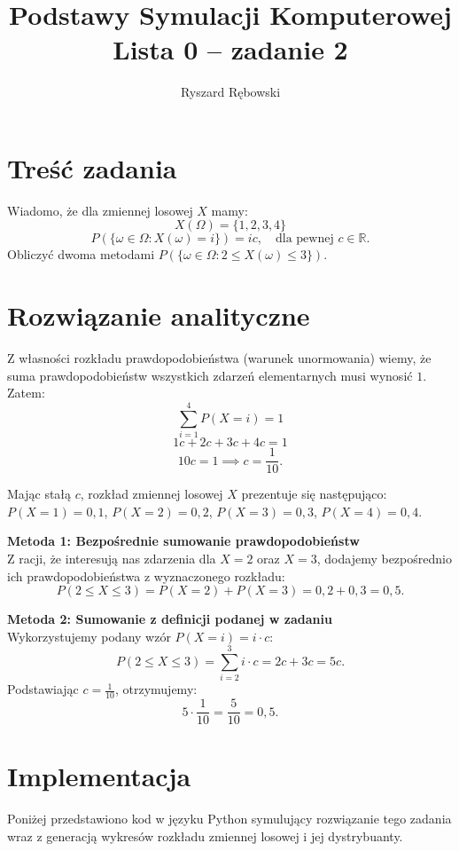 \documentclass[12pt,a4paper]{article}
\title{Podstawy Symulacji Komputerowej\\Lista 0 -- zadanie 2}
\author{Ryszard Rębowski}
\date{}
\newcommand{\sekcjazwstep}[2]{%
  \Needspace{10\baselineskip}%
  \section*{#1}%
  \nopagebreak[4]%
  #2%
}
\begin{document}
\maketitle

\sekcjazwstep{Treść zadania}{%
Wiadomo, że dla zmiennej losowej $X$ mamy:
\[ X(\Omega)=\{1,2,3,4\} \]
\[ P(\{\omega\in\Omega:X(\omega)=i\})=ic, \quad \text{dla pewnej } c\in \mathbb{R}. \]
Obliczyć dwoma metodami $P(\{\omega\in\Omega:2\le X(\omega)\le3\})$.
}

\sekcjazwstep{Rozwiązanie analityczne}{%
Z własności rozkładu prawdopodobieństwa (warunek unormowania) wiemy, że suma prawdopodobieństw wszystkich zdarzeń elementarnych musi wynosić $1$. Zatem:
\[ \sum_{i=1}^{4} P(X=i) = 1 \]
\[ 1c + 2c + 3c + 4c = 1 \]
\[ 10c = 1 \implies c = \frac{1}{10}. \]

Mając stałą $c$, rozkład zmiennej losowej $X$ prezentuje się następująco:
$P(X=1)=0{,}1$, $P(X=2)=0{,}2$, $P(X=3)=0{,}3$, $P(X=4)=0{,}4$.

\textbf{Metoda 1: Bezpośrednie sumowanie prawdopodobieństw} \\
Z racji, że interesują nas zdarzenia dla $X=2$ oraz $X=3$, dodajemy bezpośrednio ich prawdopodobieństwa z wyznaczonego rozkładu:
\[ P(2 \le X \le 3) = P(X=2) + P(X=3) = 0{,}2 + 0{,}3 = 0{,}5. \]

\textbf{Metoda 2: Sumowanie z definicji podanej w zadaniu} \\
Wykorzystujemy podany wzór $P(X=i) = i \cdot c$:
\[ P(2 \le X \le 3) = \sum_{i=2}^{3} i \cdot c = 2c + 3c = 5c. \]
Podstawiając $c = \frac{1}{10}$, otrzymujemy:
\[ 5 \cdot \frac{1}{10} = \frac{5}{10} = 0{,}5. \]
}

\sekcjazwstep{Implementacja}{%
Poniżej przedstawiono kod w języku Python symulujący rozwiązanie tego zadania wraz z generacją wykresów rozkładu zmiennej losowej i jej dystrybuanty.
}
\end{document}
